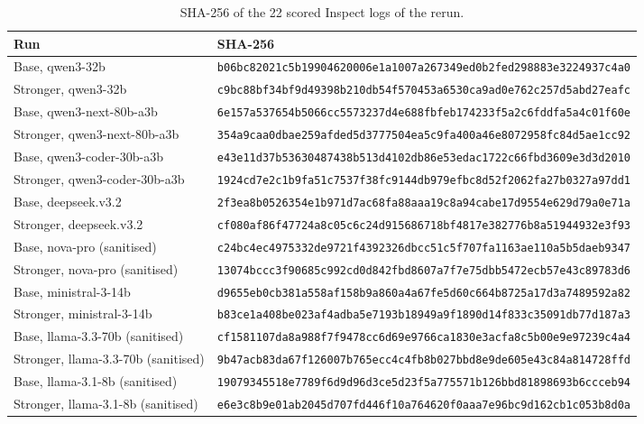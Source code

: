 \documentclass[11pt]{article}
\begin{document}
\begin{table}[!htb]
\caption{SHA-256 of the 22 scored Inspect logs of the rerun.}\label{tab:27}
\scriptsize
\begin{tabularx}{\linewidth}{@{}Yl@{}}
\toprule
\textbf{Run} & \textbf{SHA-256} \\ \midrule
Base, qwen3-32b & \texttt{b06bc82021c5b19904620006e1a1007a267349ed0b2fed298883e3224937c4a0} \\
Stronger, qwen3-32b & \texttt{c9bc88bf34bf9d49398b210db54f570453a6530ca9ad0e762c257d5abd27eafc} \\
Base, qwen3-next-80b-a3b & \texttt{6e157a537654b5066cc5573237d4e688fbfeb174233f5a2c6fddfa5a4c01f60e} \\
Stronger, qwen3-next-80b-a3b & \texttt{354a9caa0dbae259afded5d3777504ea5c9fa400a46e8072958fc84d5ae1cc92} \\
Base, qwen3-coder-30b-a3b & \texttt{e43e11d37b53630487438b513d4102db86e53edac1722c66fbd3609e3d3d2010} \\
Stronger, qwen3-coder-30b-a3b & \texttt{1924cd7e2c1b9fa51c7537f38fc9144db979efbc8d52f2062fa27b0327a97dd1} \\
Base, deepseek.v3.2 & \texttt{2f3ea8b0526354e1b971d7ac68fa88aaa19c8a94cabe17d9554e629d79a0e71a} \\
Stronger, deepseek.v3.2 & \texttt{cf080af86f47724a8c05c6c24d915686718bf4817e382776b8a51944932e3f93} \\
Base, nova-pro (sanitised) & \texttt{c24bc4ec4975332de9721f4392326dbcc51c5f707fa1163ae110a5b5daeb9347} \\
Stronger, nova-pro (sanitised) & \texttt{13074bccc3f90685c992cd0d842fbd8607a7f7e75dbb5472ecb57e43c89783d6} \\
Base, ministral-3-14b & \texttt{d9655eb0cb381a558af158b9a860a4a67fe5d60c664b8725a17d3a7489592a82} \\
Stronger, ministral-3-14b & \texttt{b83ce1a408be023af4adba5e7193b18949a9f1890d14f833c35091db77d187a3} \\
Base, llama-3.3-70b (sanitised) & \texttt{cf1581107da8a988f7f9478cc6d69e9766ca1830e3acfa8c5b00e9e97239c4a4} \\
Stronger, llama-3.3-70b (sanitised) & \texttt{9b47acb83da67f126007b765ecc4c4fb8b027bbd8e9de605e43c84a814728ffd} \\
Base, llama-3.1-8b (sanitised) & \texttt{19079345518e7789f6d9d96d3ce5d23f5a775571b126bbd81898693b6ccceb94} \\
Stronger, llama-3.1-8b (sanitised) & \texttt{e6e3c8b9e01ab2045d707fd446f10a764620f0aaa7e96bc9d162cb1c053b8d0a} \\

\end{tabularx}
\end{table}
\end{document}
